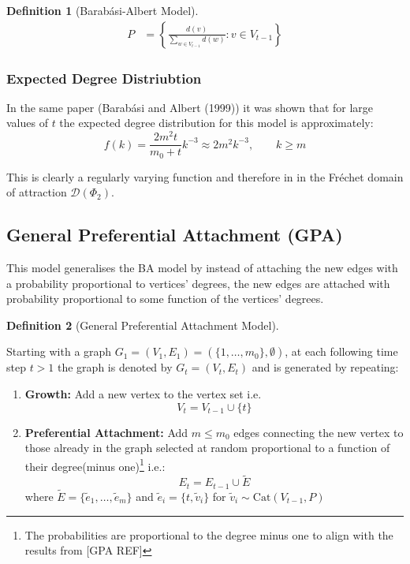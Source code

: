 \documentclass[
  10pt,
  a4paper,
]{scrreprt}
\providecommand{\tightlist}{%
  \setlength{\itemsep}{0pt}\setlength{\parskip}{0pt}}\usepackage{longtable,booktabs,array}
\theoremstyle{plain}
\theoremstyle{definition}
\newtheorem{definition}{Definition}[section]
\theoremstyle{remark}
\begin{document}
{\begin{definition}[Barabási-Albert
Model]
\begin{align*}
P &= \left\{\frac{d(v)}{\sum_{w\in V_{t-1}} d(w)} : v \in V_{t-1}\right\}
\end{align*}

\end{definition}

\hypertarget{expected-degree-distriubtion}{%
\subsubsection{Expected Degree
Distriubtion}\label{expected-degree-distriubtion}}

In the same paper (Barabási and Albert (1999)) it was shown that for
large values of \(t\) the expected degree distribution for this model is
approximately: \[
f(k) = \frac{2m^2t}{m_0+t}k^{-3} \approx 2m^2k^{-3},\qquad k\ge m
\]

This is clearly a regularly varying function and therefore in in the
Fréchet domain of attraction \(\mathcal D(\Phi_2)\).

\hypertarget{general-preferential-attachment-gpa}{%
\subsection{General Preferential Attachment
(GPA)}\label{general-preferential-attachment-gpa}}

This model generalises the BA model by instead of attaching the new
edges with a probability proportional to vertices' degrees, the new
edges are attached with probability proportional to some function of the
vertices' degrees.

\begin{definition}[General Preferential Attachment
Model]\protect\hypertarget{def-gpa}{}\label{def-gpa}

Starting with a graph
\(G_1 = (V_1, E_1) = (\{1,\ldots,m_0\}, \emptyset)\), at each following
time step \(t>1\) the graph is denoted by \(G_t = (V_t, E_t)\) and is
generated by repeating:

\begin{enumerate}
\def\labelenumi{\arabic{enumi}.}
\tightlist
\item
  \textbf{Growth:} Add a new vertex to the vertex set i.e. \[
  V_t = V_{t-1} \cup \{t\}
  \]
\item
  \textbf{Preferential Attachment:} Add \(m\le m_0\) edges connecting
  the new vertex to those already in the graph selected at random
  proportional to a function of their degree(minus one)\footnote{The
    probabilities are proportional to the degree minus one to align with
    the results from {[}GPA REF{]}} i.e.: \[
  E_t  = E_{t-1} \cup \tilde E
  \] where \(\tilde E = \{\tilde e_1,\ldots, \tilde e_m\}\) and
  \(\tilde e_i = \{t,\tilde v_i\}\) for
  \(\tilde v_i \sim \text{Cat}(V_{t-1}, P)\)
\end{enumerate}


\end{definition}}
\end{document}
